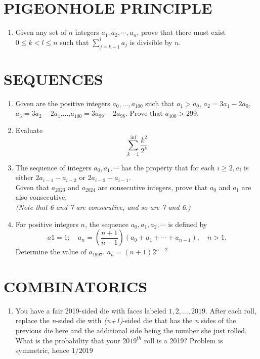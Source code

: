 \documentclass[12pt, letterpaper]{article}
\begin{document}
\section{PIGEONHOLE PRINCIPLE}
\begin{enumerate}

    \item Given any set of $n$ integers $a_1, a_2, \cdots, a_n$, prove that there must exist $0 \leq k < l \leq n$ such that $\sum_{j=k+1}^{l}a_j$ is divisible by $n$.

\end{enumerate}

\section{SEQUENCES}
\begin{enumerate}

    \item Given are the positive integers $a_{0},\dots,a_{100}$ such that $a_{1} > a_{0}$, $a_{2} = 3a_{1} - 2a_{0}$, $a_{3} = 3a_{2} - 2a_{1}$,$\dots$,$a_{100} = 3a_{99} - 2a_{98}$. Prove that $a_{100} > 299$.
    
    \item Evaluate \[ \sum_{k=1}^{\inf} \frac{k^2}{2^k}\]

    \item The sequence of integers $a_0, a_1, \cdots$ has the property that for each $i\geq2, a_i$ is either $2a_{i-1}-a_{i-2}$ or $2a_{i-2}-a_{i-1}$. \\ Given that $a_{2023}$ and $a_{2024}$ are consecutive integers, prove that $a_0$ and $a_1$ are also consecutive. \\ \textit{(Note that 6 and 7 are consecutive, and so are 7 and 6.)}

    \item For positive integers $n$, the sequence $a_0, a_1, a_2, \cdots$ is defined by \[
    a1=1; \quad a_n=\left(\frac{n+1}{n-1}\right)(a_0+a_1+\cdots +a_{n-1}),\quad n>1.
    \]
    Determine the value of $a_{1997}$.  {\color{red} $a_n=(n+1)2^{n-2}$}

\end{enumerate}

\section{COMBINATORICS}
\begin{enumerate}
    \item You have a fair 2019-sided die with faces labeled \(1, 2, \dots, 2019\). After each roll, replace the \emph{n}-sided die with \emph{(n+1)}-sided die that has the \emph{n} sides of the previous die here and the additional side being the number she just rolled. What is the probability that your \(2019^{th}\) roll is a 2019? {\color{red} Problem is symmetric, hence $1/2019$}
\end{enumerate}

\vspace{100pt}
\begin{center}
\end{center}
\end{document}
